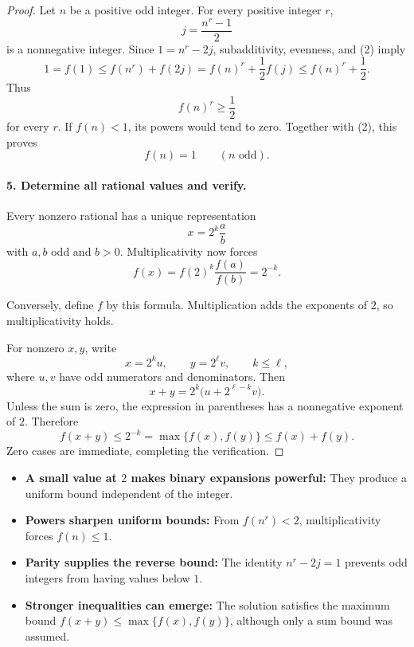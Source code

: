 \begin{dlsummary}[title={\bfseries Solution 53. When Even Numbers Become Smaller},breakable]
\begin{proof}
Let \(n\) be a positive odd integer. For every positive integer \(r\),
\[
j=\frac{n^r-1}{2}
\]
is a nonnegative integer. Since \(1=n^r-2j\), subadditivity, evenness, and (2) imply
\[
1=f(1)\le f(n^r)+f(2j)
=f(n)^r+\frac12f(j)
\le f(n)^r+\frac12.
\]
Thus
\[
f(n)^r\ge\frac12
\]
for every \(r\). If \(f(n)<1\), its powers would tend to zero. Together with (2), this proves
\[
\boxed{f(n)=1\qquad(n\text{ odd}).}
\]

\paragraph{5. Determine all rational values and verify.}

Every nonzero rational has a unique representation
\[
x=2^k\frac ab
\]
with \(a,b\) odd and \(b>0\). Multiplicativity now forces
\[
f(x)=f(2)^k\frac{f(a)}{f(b)}=2^{-k}.
\]

Conversely, define \(f\) by this formula. Multiplication adds the exponents of \(2\), so multiplicativity holds.

For nonzero \(x,y\), write
\[
x=2^k u,\qquad y=2^\ell v,\qquad k\le\ell,
\]
where \(u,v\) have odd numerators and denominators. Then
\[
x+y=2^k\bigl(u+2^{\ell-k}v\bigr).
\]
Unless the sum is zero, the expression in parentheses has a nonnegative exponent of \(2\). Therefore
\[
f(x+y)\le2^{-k}=\max\{f(x),f(y)\}\le f(x)+f(y).
\]
Zero cases are immediate, completing the verification.
\end{proof}
\end{dlsummary}

\begin{takeaways}
\begin{itemize}
\item \textbf{A small value at \(2\) makes binary expansions powerful:} They produce a uniform bound independent of the integer.
\item \textbf{Powers sharpen uniform bounds:} From \(f(n^r)<2\), multiplicativity forces \(f(n)\le1\).
\item \textbf{Parity supplies the reverse bound:} The identity \(n^r-2j=1\) prevents odd integers from having values below \(1\).
\item \textbf{Stronger inequalities can emerge:} The solution satisfies the maximum bound \(f(x+y)\le\max\{f(x),f(y)\}\), although only a sum bound was assumed.
\end{itemize}
\end{takeaways}
